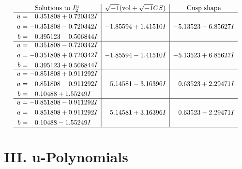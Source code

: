 \documentclass[1p]{elsarticle_modified}
\theoremstyle{definition}
\newcommand{\I}{\sqrt{-1}}
\begin{document}
$$\begin{array}{c|c|c}  
\text{Solutions to }I^u_{2}& \I (\text{vol} + \sqrt{-1}CS) & \text{Cusp shape}\\
 \hline 
\begin{aligned}
u &= \phantom{-}0.351808 + 0.720342 I \\
a &= -0.351808 - 0.720342 I \\
b &= \phantom{-}0.395123 - 0.506844 I\end{aligned}
 & -1.85594 + 1.41510 I & -5.13523 - 6.85627 I \\ \hline\begin{aligned}
u &= \phantom{-}0.351808 - 0.720342 I \\
a &= -0.351808 + 0.720342 I \\
b &= \phantom{-}0.395123 + 0.506844 I\end{aligned}
 & -1.85594 - 1.41510 I & -5.13523 + 6.85627 I \\ \hline\begin{aligned}
u &= -0.851808 + 0.911292 I \\
a &= \phantom{-}0.851808 - 0.911292 I \\
b &= \phantom{-}0.10488 + 1.55249 I\end{aligned}
 & \phantom{-}5.14581 - 3.16396 I & \phantom{-}0.63523 + 2.29471 I \\ \hline\begin{aligned}
u &= -0.851808 - 0.911292 I \\
a &= \phantom{-}0.851808 + 0.911292 I \\
b &= \phantom{-}0.10488 - 1.55249 I\end{aligned}
 & \phantom{-}5.14581 + 3.16396 I & \phantom{-}0.63523 - 2.29471 I\\
 \hline 
 \end{array}$$\newpage
\newpage\renewcommand{\arraystretch}{1}
\centering \section*{ III. u-Polynomials}
\end{document}
